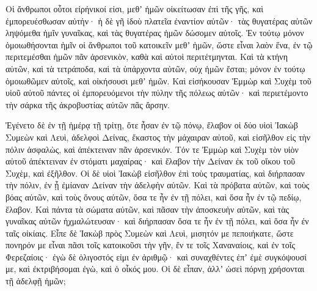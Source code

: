 {Οἱ ἄνθρωποι οὗτοι εἰρήνικοί εἰσι, μεθʼ ἡμῶν οἰκείτωσαν ἐπὶ τῆς γῆς, καὶ ἐμπορευέσθωσαν αὐτήν· ἡ δὲ γῆ ἰδοὺ πλατεῖα ἐναντίον αὐτῶν· τὰς θυγατέρας αὐτῶν ληψόμεθα ἡμῖν γυναῖκας, καὶ τὰς θυγατέρας ἡμῶν δώσομεν αὐτοῖς.
Ἐν τούτῳ μόνον ὁμοιωθήσονται ἡμῖν οἱ ἄνθρωποι τοῦ κατοικεῖν μεθʼ ἡμῶν, ὥστε εἶναι λαὸν ἕνα, ἐν τῷ περιτεμέσθαι ἡμῶν πᾶν ἀρσενικὸν, καθὰ καὶ αὐτοὶ περιτέτμηνται.
Καὶ τὰ κτήνη αὐτῶν, καὶ τὰ τετράποδα, καὶ τὰ ὑπάρχοντα αὐτῶν, οὐχ ἡμῶν ἔσται; μόνον ἐν τούτῳ ὁμοιωθῶμεν αὐτοῖς, καὶ οἰκήσουσι μεθʼ ἡμῶν.
Καὶ εἰσήκουσαν Ἐμμὼρ καὶ Συχὲμ τοῦ υἱοῦ αὐτοῦ πάντες οἱ ἐμπορευόμενοι τὴν πύλην τῆς πόλεως αὐτῶν· καὶ περιετέμοντο τὴν σάρκα τῆς ἀκροβυστίας αὐτῶν πᾶς ἄρσην.
\par }{\PP {}Ἐγένετο δὲ ἐν τῇ ἡμέρᾳ τῇ τρίτῃ, ὅτε ἦσαν ἐν τῷ πόνῳ, ἔλαβον οἱ δύο υἱοὶ Ἰακὼβ Συμεὼν καὶ Λευὶ, ἀδελφοὶ Δείνας, ἕκαστος τὴν μάχαιραν αὐτοῦ, καὶ εἰσῆλθον εἰς τὴν πόλιν ἀσφαλὼς, καὶ ἀπέκτειναν πᾶν ἀρσενικόν.
Τόν τε Ἐμμὼρ καὶ Συχὲμ τὸν υἱὸν αὐτοῦ ἀπέκτειναν ἐν στόματι μαχαίρας· καὶ ἔλαβον τὴν Δείναν ἐκ τοῦ οἴκου τοῦ Συχὲμ, καὶ ἐξῆλθον.
Οἱ δὲ υἱοὶ Ἰακὼβ εἰσῆλθον ἐπὶ τοὺς τραυματίας, καὶ διήρπασαν τὴν πόλιν, ἐν ᾗ ἐμίαναν Δείναν τὴν ἀδελφὴν αὐτῶν.
Καὶ τὰ πρόβατα αὐτῶν, καὶ τοὺς βόας αὐτῶν, καὶ τοὺς ὄνους αὐτῶν, ὅσα τε ἦν ἐν τῇ πόλει, καὶ ὅσα ἦν ἐν τῷ πεδίῳ, ἔλαβον.
Καὶ πάντα τὰ σώματα αὐτῶν, καὶ πᾶσαν τὴν ἀποσκευὴν αὐτῶν, καὶ τὰς γυναῖκας αὐτῶν ἠχμαλώτευσαν· καὶ διήρπασαν ὅσα τε ἦν ἐν τῇ πόλει, καὶ ὅσα ἦν ἐν ταῖς οἰκίαις.
Εἶπε δὲ Ἰακὼβ πρὸς Συμεὼν καὶ Λευὶ, μισητόν με πεποιήκατε, ὥστε πονηρόν με εἶναι πᾶσι τοῖς κατοικοῦσι τὴν γῆν, ἔν τε τοῖς Χαναναίοις, καὶ ἐν τοῖς Φερεζαίοις· ἐγὼ δὲ ὀλιγοστός εἰμι ἐν ἀριθμῷ· καὶ συναχθέντες ἐπʼ ἐμὲ συγκόψουσί με, καὶ ἐκτριβήσομαι ἐγὼ, καὶ ὁ οἶκός μου.
Οἱ δὲ εἶπαν, ἀλλʼ ὡσεὶ πόρνῃ χρήσονται τῇ ἀδελφῇ ἡμῶν;

}
